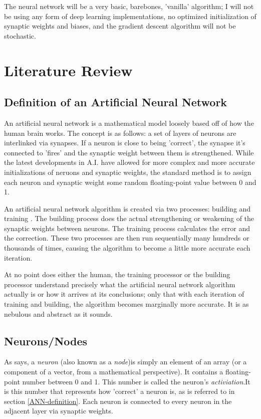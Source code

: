 \documentclass[12pt]{article}
\begin{document}
        The neural network will be a very basic, barebones, 'vanilla' algorithm; I will not be using any form of deep learning implementations, no optimized initialization of synaptic weights and biases, and the gradient descent algorithm will not be stochastic.

\section{Literature Review}

    \subsection{Definition of an Artificial Neural Network \label{ANN-definition}}
        
        An artificial neural network is a mathematical model loosely based off of how the human brain works. The concept is as follows: a set of layers of neurons are interlinked via synapses. If a neuron is close to being 'correct', the synapse it's connected to 'fires' and the synaptic weight between them is strengthened. While the latest developments in A.I. have allowed for more complex and  more accurate initializations of neruons and synaptic weights, the standard method is to assign each neuron and synaptic weight some random floating-point value between 0 and 1. 

        An artificial neural network algorithm is created via two processes: building and training \textcite{GCPGreyAI}. The building process does the actual strengthening or weakening of the synaptic weights between neurons. The training  process calculates the error and the correction. These two processes are then run sequentially many hundreds or thousands of times, causing the algorithm to become a little more accurate each iteration.
        
        At no point does either the human, the training processor or the building processor understand precisely what the artificial neural network algorithm actually is or how it arrives at its conclusions; only that with each iteration of training and building, the algorithm becomes marginally more accurate. It is as nebulous and abstract as it sounds.

    \subsection{Neurons/Nodes \label{neuron}}
        
        As \textcite{DeepLearningCh1} says, a \textit{neuron} (also known as a \textit{node})is simply an element of an array (or a component of a vector, from a mathematical perspective). It contains a floating-point number between 0 and 1. This number is called the neuron's \textit{activiation}.It is this number that represents how 'correct' a neuron is, as is referred to in section \ref{ANN-definition}. Each neuron is connected to every neuron in the adjacent layer via synaptic weights.
\end{document}
